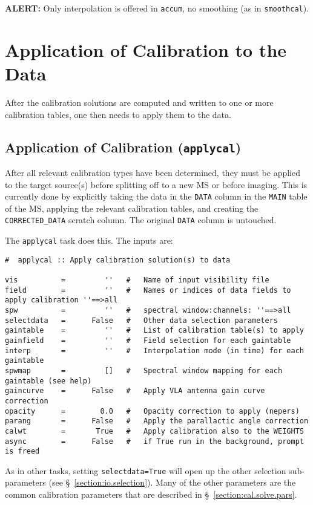 {\bf ALERT:} Only interpolation is offered in {\tt accum},
no smoothing (as in {\tt smoothcal}).

\section{Application of Calibration to the Data}
\label{section:cal.correct}

After the calibration solutions are computed and written to
one or more calibration tables, one then needs to apply them to the data.

\subsection{Application of Calibration ({\tt applycal})}
\label{section:cal.correct.apply}

After all relevant calibration types have been determined, they must
be applied to the target source(s) before splitting off to a new
MS or before imaging.  This is currently done by explicitly taking the
data in the {\tt DATA} column in the {\tt MAIN} table of the MS, 
applying the relevant calibration tables, and creating the 
{\tt CORRECTED\_DATA} scratch column.  The original {\tt DATA}
column is untouched.

The {\tt applycal} task does this.  The inputs are:
\small
\begin{verbatim}
#  applycal :: Apply calibration solution(s) to data

vis          =         ''   #   Name of input visibility file
field        =         ''   #   Names or indices of data fields to apply calibration ''==>all
spw          =         ''   #   spectral window:channels: ''==>all
selectdata   =      False   #   Other data selection parameters
gaintable    =         ''   #   List of calibration table(s) to apply
gainfield    =         ''   #   Field selection for each gaintable
interp       =         ''   #   Interpolation mode (in time) for each gaintable
spwmap       =         []   #   Spectral window mapping for each gaintable (see help)
gaincurve    =      False   #   Apply VLA antenna gain curve correction
opacity      =        0.0   #   Opacity correction to apply (nepers)
parang       =      False   #   Apply the parallactic angle correction
calwt        =       True   #   Apply calibration also to the WEIGHTS
async        =      False   #   if True run in the background, prompt is freed
\end{verbatim}
\normalsize
As in other tasks, setting {\tt selectdata=True} will open up the
other selection sub-parameters (see \S~\ref{section:io.selection}).
Many of the other parameters are the common calibration parameters
that are described in \S~\ref{section:cal.solve.pars}.

